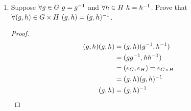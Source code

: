 \begin{enumerate}[label={\Alph*.},font={\bfseries}]
\begin{enumerate}[label={\arabic*},font={\bfseries}]
\begin{proof}
    \end{proof}
  \item Suppose $\forall g \in G\ g = g^{-1}$ and $\forall h \in H\ h = h^{-1}$. Prove that $\forall (g,h) \in G \times H\ (g,h) = (g,h)^{-1}$.
    \begin{proof}
      \begin{align*}
        (g,h)(g,h) &= (g,h)(g^{-1},h^{-1}) \\
        &= (gg^{-1},hh^{-1}) \\
        &= (e_G,e_H) = e_{G \times H} \\
        &= (g,h)(g,h)^{-1} \\
        (g,h) &= (g,h)^{-1}
      \end{align*}
    \end{proof}
  \end{enumerate}
\end{enumerate}
